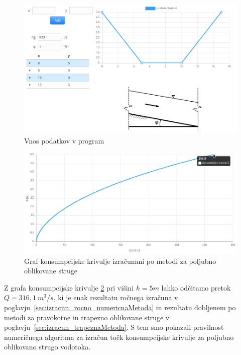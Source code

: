\begin{figure}[H]
	\begin{centering}
		\includegraphics[width=\textwidth]{slike/izracuni/poljubna_struga.png}\caption{Vnos podatkov v program}\label{fig:modeliranjeStruge}
	\end{centering}
\end{figure}

\begin{figure}[H]
	\begin{centering}
		\includegraphics[width=\textwidth]{slike/izracuni/poljubna_konsumpcijska.png}\caption{Graf konsumpcijske krivulje izračunani po metodi za poljubno oblikovane struge}\label{fig:custom_konsumpcijskaKrivulja}
	\end{centering}
\end{figure}


Z grafa konsumpcijske krivulje \ref{fig:custom_konsumpcijskaKrivulja} pri višini $h = 5m$ lahko odčitamo pretok $Q=316,1~m^3/s$, ki je enak rezultatu ročnega izračuna v poglavju~\ref{sec:izracun_rocno_numericnaMetoda} in rezultatu dobljenem po metodi za pravokotne in trapezno oblikovane struge v poglavju~\ref{sec:izracun_trapeznaMetoda}. S tem smo pokazali pravilnost numeričnega algoritma za izračun točk konsumpcijske krivulje za poljubno oblikovano strugo vodotoka.




